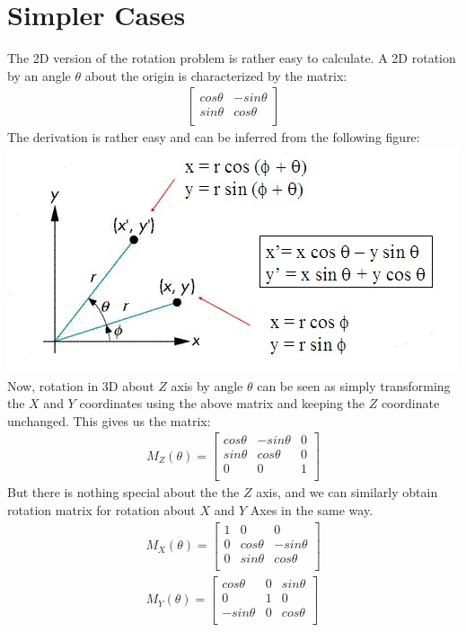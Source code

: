 \documentclass[
11pt, %
english, %
singlespacing, %
headsepline, %
]{MastersDoctoralThesis} %
\begin{document}
\section{Simpler Cases}
The 2D version of the rotation problem is rather easy to calculate. A 2D rotation by an angle $\theta$ about the origin is characterized by the matrix:
\begin{align*}
\begin{bmatrix} 
cos\theta & -sin\theta \\
sin\theta & cos\theta\\
\end{bmatrix}
\end{align*}
The derivation is rather easy and can be inferred from the following figure:\\
\includegraphics{img1}
Now, rotation in 3D about $Z$ axis by angle $\theta$ can be seen as simply transforming the $X$ and $Y$ coordinates using the above matrix and keeping the $Z$ coordinate unchanged. This gives us the matrix:
\begin{align*}
M_Z(\theta) = 
\begin{bmatrix} 
cos\theta & -sin\theta & 0 \\
sin\theta & cos\theta & 0\\
0 & 0 & 1 \\
\end{bmatrix}
\end{align*}
But there is nothing special about the the $Z$ axis, and we can similarly obtain rotation matrix for rotation about $X$ and $Y$ Axes in the same way.\\
\begin{align*}
M_X(\theta) = 
\begin{bmatrix} 
1 & 0 & 0 \\
0 & cos\theta & -sin\theta \\
0 & sin\theta & cos\theta \\
\end{bmatrix} \\
M_Y(\theta) = 
\begin{bmatrix} 
cos\theta & 0 & sin\theta \\
0 & 1 & 0 \\
-sin\theta & 0 & cos\theta \\
\end{bmatrix}
\end{align*}
\end{document}
